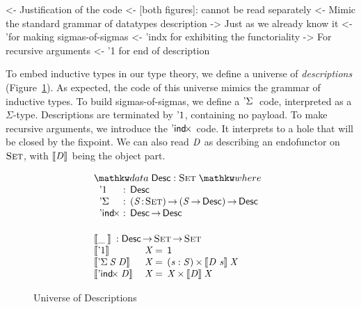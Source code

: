 \begin{wstructure}
<- Justification of the code 
    <- [both figures]: cannot be read separately
    <- Mimic the standard grammar of datatypes description
        -> Just as we already know it
        <- '\Sigma for making sigmas-of-sigmas
        <- 'indx for exhibiting the functoriality
            -> For recursive arguments
        <- '1 for end of description
\end{wstructure}

To embed inductive types in our type theory, we define a universe of
\emph{descriptions} (Figure~\ref{fig:desc_universe}). As expected, the
code of this universe mimics the grammar of inductive types. To build
sigmas-of-sigmas, we define a $\DSigma{\!}{}$ code, interpreted as a
$\Sigma$-type. Descriptions are terminated by $\DUnit$, containing no
payload. To make recursive arguments, we introduce the $\DIndx{\!}$
code. It interprets to a hole that will be closed by the fixpoint. We
can also read $\V{D}$ as describing an endofunctor on $\Set$, with
$\descop{\V{D}}{\!}$ being the object part.

\begin{figure}

\[\stk{
\begin{array}{ll}
\stk{
\data \Desc : \Set \where \\
\;\;\begin{array}{@{}l@{\::\:\:}l@{\quad}l}
    \DUnit          & \Desc \\
    \DSigma{\!}{\!} & \PI{\V{S}}{\Set} \PIS{\V{S} \To \Desc} \Desc \\
    \DIndx{\!}      & \Desc \To \Desc
\end{array}
}
\vspace{0.2in}
\\
\stk{
\descop{\_\:}{} : \Desc \To \Set \To \Set \\
\begin{array}{@{}ll@{\:=\:\:}ll}
\descop{\DUnit}{& \V{X}}        &  \Unit                                       \\
\descop{\DSigma{\V{S}}{\V{D}}}{& \V{X}} &  \SIGMAS{\V{s} : \V{S}}{\descop{\V{D}~\V{s}}{\V{X}}}         \\
\descop{\DIndx{\V{D}}}{& \V{X}}     &  \TIMES{\V{X}}{\descop{\V{D}}{\V{X}}}
\end{array}
}
\end{array}
}\]


\caption{Universe of Descriptions}
\label{fig:desc_universe}

\end{figure}


